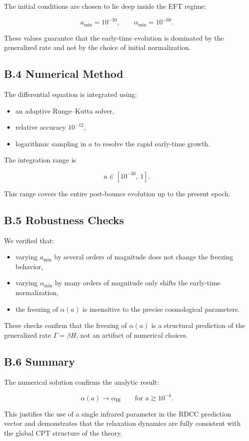 \documentclass[11pt,a4paper]{article}
\begin{document}
The initial conditions are chosen to lie deep inside the EFT regime:


\[
    a_{\mathrm{min}} = 10^{-30}, \qquad
    \alpha_{\mathrm{min}} = 10^{-60}.
\]



These values guarantee that the early-time evolution is dominated by the generalized
rate and not by the choice of initial normalization.

\subsection*{B.4 Numerical Method}

The differential equation is integrated using:
\begin{itemize}
    \item an adaptive Runge–Kutta solver,
    \item relative accuracy $10^{-12}$,
    \item logarithmic sampling in $a$ to resolve the rapid early-time growth.
\end{itemize}

The integration range is


\[
    a \in [10^{-30},\, 1].
\]



This range covers the entire post-bounce evolution up to the present epoch.

\subsection*{B.5 Robustness Checks}

We verified that:
\begin{itemize}
    \item varying $a_{\mathrm{min}}$ by several orders of magnitude does not change the
    freezing behavior,
    \item varying $\alpha_{\mathrm{min}}$ by many orders of magnitude only shifts the
    early-time normalization,
    \item the freezing of $\alpha(a)$ is insensitive to the precise cosmological parameters.
\end{itemize}

These checks confirm that the freezing of $\alpha(a)$ is a structural prediction of the
generalized rate $\Gamma = \beta H$, not an artifact of numerical choices.

\subsection*{B.6 Summary}

The numerical solution confirms the analytic result:


\[
    \alpha(a) \to \alpha_{\mathrm{IR}}
    \qquad \text{for } a \gtrsim 10^{-4}.
\]



This justifies the use of a single infrared parameter in the RDCC prediction vector and
demonstrates that the relaxation dynamics are fully consistent with the global CPT
structure of the theory.
\end{document}
